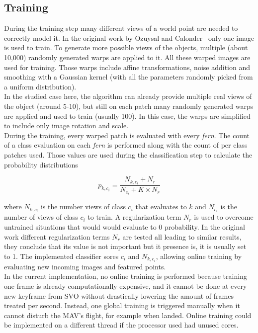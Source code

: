 \subsection{Training}
\label{sub:training}

During the training step many different views of a world point are needed to correctly model it. In the original work by Ozuysal and Calonder~\cite{Ozuysal2010} only one image is used to train. To generate more possible views of the objects, multiple (about 10,000) randomly generated warps are applied to it. All these warped images are used for training. Those warps include affine transformations, noise addition and smoothing with a Gaussian kernel (with all the parameters randomly picked from a uniform distribution).\\

In the studied case here, the algorithm can already provide multiple real views of the object (around 5-10), but still on each patch many randomly generated warps are applied and used to train (usually 100). In this case, the warps are simplified to include only image rotation and scale.\\

During the training, every warped patch is evaluated with every \textit{fern}. The count of a class evaluation on each \textit{fern} is performed along with the count of per class patches used. Those values are used during the classification step to calculate the probability distributions

\begin{equation}
  p_{k,c_i} = \frac{N_{k,c_i} + N_r}{N_{c_i} + K \times N_r}
\end{equation}

where $N_{k,c_i}$ is the number views of class $c_i$ that evaluates to $k$ and $N_{c_i}$ is the number of views of class $c_i$ to train. A regularization term $N_r$ is used to overcome untrained situations that would would evaluate to 0 probability. In the original work different regularization terms $N_r$ are tested all leading to similar results, they conclude that its value is not important but it presence is, it is usually set to 1. The implemented classifier sores $c_i$  and $N_{k,c_i}$, allowing online training by evaluating new incoming images and featured points.\\

In the current implementation, no online training is performed because training one frame is already computationally expensive, and it cannot be done at every new keyframe from SVO without drastically lowering the amount of frames treated per second. Instead, one global training is triggered manually when it cannot disturb the MAV's flight, for example when landed. Online training could be implemented on a different thread if the processor used  had unused cores.\\


